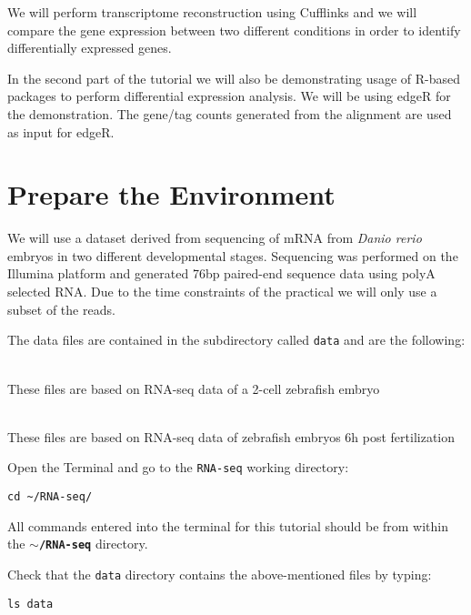 We will perform transcriptome reconstruction using Cufflinks and we will compare
the gene expression between two different conditions in order to identify
differentially expressed genes.

In the second part of the tutorial we will also be demonstrating usage of R-based packages to perform differential expression analysis.
We will be using edgeR for the demonstration. The gene/tag counts generated from the alignment are used as input for edgeR.
\section{Prepare the Environment}
We will use a dataset derived from sequencing of mRNA from \textit{Danio rerio} embryos
in two different developmental stages. Sequencing was performed on the Illumina
platform and generated 76bp paired-end sequence data using polyA selected RNA.
Due to the time constraints of the practical we will only use a subset of the
reads.

The data files are contained in the subdirectory called \texttt{data} and are
the following:
\begin{description}[style=multiline,labelindent=1.5cm,align=left,leftmargin=2.5cm]
  \item[\texttt{2cells\_1.fastq} and \texttt{2cells\_2.fastq}] \hfill\\
 These files are based on RNA-seq data of a 2-cell zebrafish embryo
  \item[\texttt{6h\_1.fastq} and \texttt{6h\_2.fastq}] \hfill\\
 These files are based on RNA-seq data of zebrafish embryos 6h post
 fertilization
\end{description}

\begin{steps}
Open the Terminal and go to the \texttt{RNA-seq} working directory:
\begin{lstlisting}
cd ~/RNA-seq/
\end{lstlisting}
\end{steps}

\begin{warning}
  All commands entered into the terminal for this tutorial should be from within the
  \textbf{\texttt{$\sim$/RNA-seq}} directory.
\end{warning}

\begin{steps}
Check that the \texttt{data} directory contains the above-mentioned files by typing:
\begin{lstlisting}
ls data
\end{lstlisting}
\end{steps}

